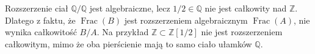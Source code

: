 \begin{przyklad}
\label{aa:prz:integral-nonexample}
Rozszerzenie ciał $\mathbb Q/\mathbb Q$ jest algebraiczne,
lecz $1/2\in\mathbb Q$ nie jest całkowity nad $\mathbb Z$.
Dlatego z faktu, że $\operatorname{Frac}(B)$ jest rozszerzeniem
algebraicznym $\operatorname{Frac}(A)$, nie wynika całkowitość
$B/A$. Na przykład $\mathbb Z\subset\mathbb Z[1/2]$
nie jest rozszerzeniem całkowitym, mimo że oba pierścienie mają
to samo ciało ułamków $\mathbb Q$.
\end{przyklad}

